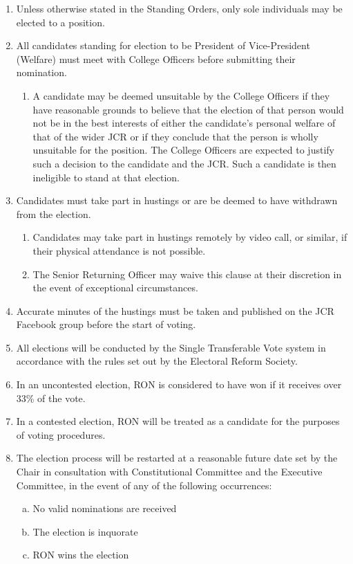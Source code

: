\documentclass[12pt]{article}  %
\begin{document}
\begin{enumerate}
    \item Unless otherwise stated in the Standing Orders, only sole individuals may be elected to a position.
    \item All candidates standing for election to be President of Vice-President (Welfare) must meet with College Officers before submitting their nomination.
    \begin{enumerate}
        \item A candidate may be deemed unsuitable by the College Officers if they have reasonable grounds to believe that the election of that person would not be in the best interests of either the candidate’s personal welfare of that of the wider JCR or if they conclude that the person is wholly unsuitable for the position. The College Officers are expected to justify such a decision to the candidate and the JCR. Such a candidate is then ineligible to stand at that election. 
    \end{enumerate}
    \item Candidates must take part in hustings or are be deemed to have withdrawn from the election.
    \begin{enumerate}
        \item Candidates may take part in hustings remotely by video call, or similar, if their physical attendance is not possible.
        \item The Senior Returning Officer may waive this clause at their discretion in the event of exceptional circumstances.
    \end{enumerate}
    \item Accurate minutes of the hustings must be taken and published on the JCR Facebook group before the start of voting.
    \item All elections will be conducted by the Single Transferable Vote system in accordance with the rules set out by the Electoral Reform Society.
    \item In an uncontested election, RON is considered to have won if it receives over 33\% of the vote.
    \item In a contested election, RON will be treated as a candidate for the purposes of voting procedures.
    \item The election process will be restarted at a reasonable future date set by the Chair in consultation with Constitutional Committee and the Executive Committee, in the event of any of the following occurrences:
    \begin{enumerate}[(a)]
        \item No valid nominations are received
        \item The election is inquorate
        \item RON wins the election
    \end{enumerate}

\end{enumerate}
\end{document}
